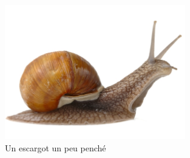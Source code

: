 \documentclass[a4paper, 11pt]{article}
\begin{document}
    \begin{figure}[h]
        \centering
        \includegraphics[width=0.7\textwidth,angle=45]{img/escargot.jpg}
        \caption{Un escargot un peu penché}
    \end{figure}
\end{document}
